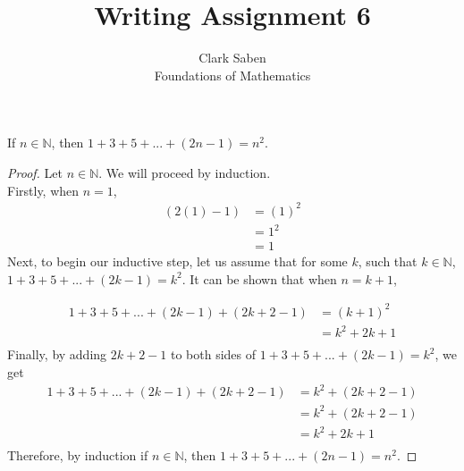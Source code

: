 \documentclass[12pt]{article}
\newenvironment{theorem}[2][Theorem]{\begin{trivlist}
\item[\hskip \labelsep {\bfseries #1}\hskip \labelsep {\bfseries #2.}]}{\end{trivlist}}
\begin{document}
 
 
\title{Writing Assignment 6}%
\author{Clark Saben\\ %
Foundations of Mathematics} %
 
\maketitle

 
\begin{theorem}{WA 6.1}
	If $n \in \mathbb{N}$, then $1+3+5+...+(2n-1) = n^2$. 
\end{theorem}
\begin{proof}
Let $n \in \mathbb{N}$. We will proceed by induction.\\
Firstly, when $n=1$,
\begin{align*}
	(2(1)-1) &= (1)^2\\
		 &= 1^2\\
		 &= 1
\end{align*}
Next, to begin our inductive step, let us assume that for some $k$, such that $k \in \mathbb{N}$, $1+3+5+...+(2k-1) = k^2$. 
It can be shown that when $n=k+1$,

\begin{align*}
	1+3+5+...+(2k-1) + (2k+2-1) &= (k+1)^2\\
				    &= k^2 + 2k + 1\\
\end{align*}
Finally, by adding $2k+2-1$ to both sides of $1+3+5+...+(2k-1) = k^2$, we get
\begin{align*}
	{1+3+5+...+(2k-1) + (2k+2-1)} &= k^2 + (2k+2-1)\\
				      &= k^2 + (2k+2-1)\\
				      &= k^2 + 2k + 1\\
\end{align*}
Therefore, by induction if $n \in \mathbb{N}$, then $1+3+5+...+(2n-1) = n^2$.
\end{proof}
 
\pagebreak
\end{document}
